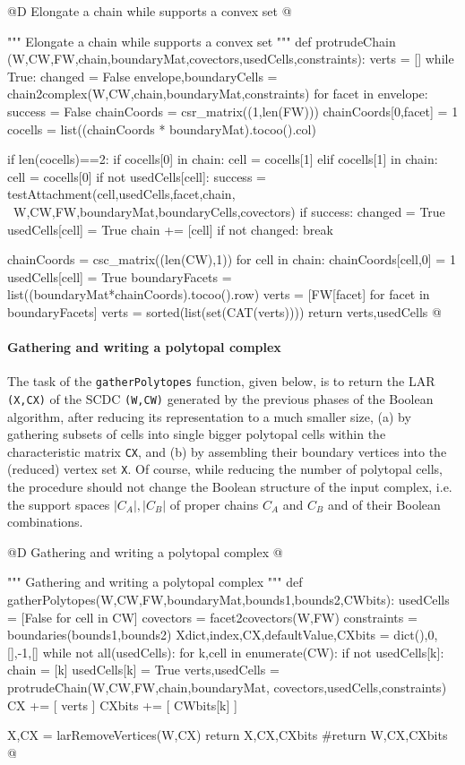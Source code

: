 \documentclass[11pt,oneside]{article}	%
\begin{document}
@D Elongate a chain while supports a convex set
@{""" Elongate a chain while supports a convex set """
def protrudeChain (W,CW,FW,chain,boundaryMat,covectors,usedCells,constraints):
	verts = []
	while True:	
		changed = False
		envelope,boundaryCells = chain2complex(W,CW,chain,boundaryMat,constraints)
		for facet in envelope:
			success = False
			chainCoords = csr_matrix((1,len(FW)))
			chainCoords[0,facet] = 1
			cocells = list((chainCoords * boundaryMat).tocoo().col)
			
			if len(cocells)==2:
				if cocells[0] in chain: cell = cocells[1]
				elif cocells[1] in chain: cell = cocells[0]
				if not usedCells[cell]:
					success = testAttachment(cell,usedCells,facet,chain, \
								W,CW,FW,boundaryMat,boundaryCells,covectors)
				if success: 
					changed = True
					usedCells[cell] = True
					chain += [cell]
		if not changed: break		
			
	chainCoords = csc_matrix((len(CW),1))
	for cell in chain: 
		chainCoords[cell,0] = 1
		usedCells[cell] = True
	boundaryFacets = list((boundaryMat*chainCoords).tocoo().row)
	verts = [FW[facet] for facet in boundaryFacets]
	verts = sorted(list(set(CAT(verts))))
	return verts,usedCells
@}

\paragraph{Gathering and writing a polytopal complex}
The task of the \texttt{gatherPolytopes} function, given below, is to return the LAR \texttt{(X,CX)} of the SCDC \texttt{(W,CW)} generated by the previous phases of the Boolean algorithm, after reducing its representation to a much smaller size, (a) by gathering subsets of cells into single bigger polytopal cells within the characteristic matrix \texttt{CX}, and (b) by assembling their boundary vertices into the (reduced) vertex set \texttt{X}. Of course, while reducing the number of polytopal cells, the procedure should not change the Boolean structure of the input complex, i.e. the support spaces $|C_A|, |C_B|$ of proper chains $C_A$ and $C_B$ and of their Boolean combinations.

@D Gathering and writing a polytopal complex
@{""" Gathering and writing a polytopal complex """
def gatherPolytopes(W,CW,FW,boundaryMat,bounds1,bounds2,CWbits):
	usedCells = [False for cell in CW]
	covectors = facet2covectors(W,FW)
	constraints = boundaries(bounds1,bounds2)
	Xdict,index,CX,defaultValue,CXbits = dict(),0,[],-1,[]
	while not all(usedCells):
		for k,cell in enumerate(CW):
			if not usedCells[k]:
				chain = [k]
				usedCells[k] = True
				verts,usedCells = protrudeChain(W,CW,FW,chain,boundaryMat,
									covectors,usedCells,constraints)
				CX += [ verts ]
				CXbits += [ CWbits[k] ]
				
	X,CX = larRemoveVertices(W,CX)
	return X,CX,CXbits
	#return W,CX,CXbits
@}
\end{document}
